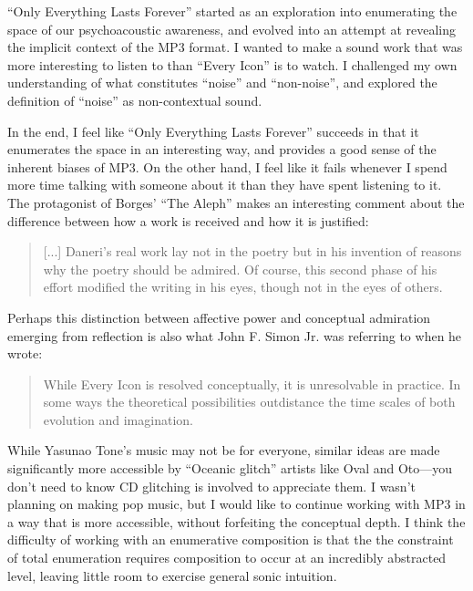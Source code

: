 \documentclass{thesis}
\begin{document}
``Only Everything Lasts Forever'' started as an exploration into enumerating the space of our psychoacoustic awareness, and evolved into an attempt at revealing the implicit context of the MP3 format. I wanted to make a sound work that was more interesting to listen to than ``Every Icon'' is to watch. I challenged my own understanding of what constitutes ``noise'' and ``non-noise'', and explored the definition of ``noise'' as non-contextual sound.

In the end, I feel like ``Only Everything Lasts Forever'' succeeds in that it enumerates the space in an interesting way, and provides a good sense of the inherent biases of MP3. On the other hand, I feel like it fails whenever I spend more time talking with someone about it than they have spent listening to it. The protagonist of Borges' ``The Aleph'' makes an interesting comment about the difference between how a work is received and how it is justified:
	
	\begin{quote}
	[...] Daneri's real work lay not in the poetry but in his invention of reasons why the poetry should be admired. Of course, this second phase of his effort modified the writing in his eyes, though not in the eyes of others.
	\end{quote}
	
Perhaps this distinction between affective power and conceptual admiration emerging from reflection is also what John F. Simon Jr. was referring to when he wrote:
	
	\begin{quote}
	While Every Icon is resolved conceptually, it is unresolvable in practice. In some ways the theoretical possibilities outdistance the time scales of both evolution and imagination.\cite{john_f._simon_jr._given:32_1997}
	\end{quote}

While Yasunao Tone's music may not be for everyone, similar ideas are made significantly more accessible by ``Oceanic glitch''\cite{Sangild04} artists like Oval and Oto---you don't need to know CD glitching is involved to appreciate them. I wasn't planning on making pop music, but I would like to continue working with MP3 in a way that is more accessible, without forfeiting the conceptual depth. I think the difficulty of working with an enumerative composition is that the the constraint of total enumeration requires composition to occur at an incredibly abstracted level, leaving little room to exercise general sonic intuition.
\end{document}
